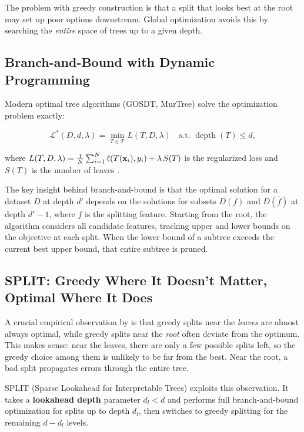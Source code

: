 The problem with greedy construction is that a split that looks best at the
root may set up poor options downstream.  Global optimization avoids this
by searching the \emph{entire} space of trees up to a given depth.

\subsection{Branch-and-Bound with Dynamic Programming}

Modern optimal tree algorithms (GOSDT, MurTree) solve the optimization
problem exactly:

\begin{equation}\label{eq:optimal-tree}
  \mathcal{L}^*(D, d, \lambda) = \min_{T \in \mathcal{T}}
    L(T, D, \lambda) \quad \text{s.t. } \operatorname{depth}(T) \leq d,
\end{equation}

\noindent where $L(T, D, \lambda) = \frac{1}{N}\sum_{i=1}^{N}
\ell(T(\mathbf{x}_i), y_i) + \lambda\,S(T)$ is the regularized loss and
$S(T)$ is the number of leaves \citep{BabbarEtAl2025}.

The key insight behind branch-and-bound is that the optimal solution for
a dataset $D$ at depth $d'$ depends on the solutions for subsets $D(f)$ and
$D(\bar{f})$ at depth $d'-1$, where $f$ is the splitting feature.  Starting
from the root, the algorithm considers all candidate features, tracking
upper and lower bounds on the objective at each split.  When the lower bound
of a subtree exceeds the current best upper bound, that entire subtree is
pruned.

\subsection{SPLIT: Greedy Where It Doesn't Matter, Optimal Where It Does}

A crucial empirical observation by \citet{BabbarEtAl2025} is that greedy
splits near the \emph{leaves} are almost always optimal, while greedy splits
near the \emph{root} often deviate from the optimum.  This makes sense: near
the leaves, there are only a few possible splits left, so the greedy choice
among them is unlikely to be far from the best.  Near the root, a bad split
propagates errors through the entire tree.

SPLIT (Sparse Lookahead for Interpretable Trees) exploits this observation.
It takes a \textbf{lookahead depth} parameter $d_l < d$ and performs full
branch-and-bound optimization for splits up to depth $d_l$, then switches to
greedy splitting for the remaining $d - d_l$ levels.


